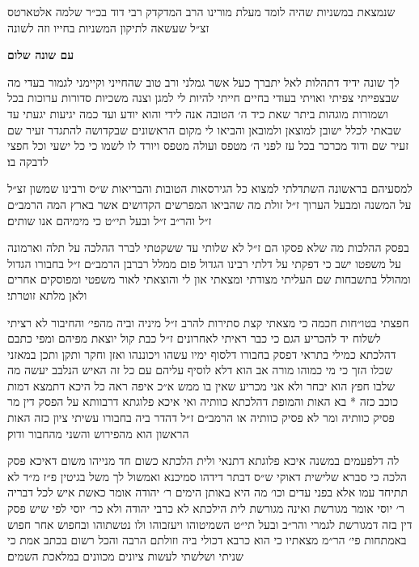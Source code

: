 \setcounter{page}{1}

{
  \centering
  \large
  שנמצאת במשניות שהיה לומד מעלת מורינו הרב המדקדק רבי דוד בכ״ר שלמה אלטארטס זצ״ל שעשאה לתיקון המשניות בחייו וזה לשונה
}

{\centering\LARGE\bfseries עם שונה שלום

}

{
  \small
  \centerlastline
  לך שונה ידיד דתהלות לאל יתברך כעל אשר גמלני ורב טוב שהחייני
  וקיימני לגמור בעדי מה שבצפייתי צפיתי ואויתי בעודי בחיים חייתי להיות
  לי למגן וצנה משכיות סדורות ערוכות בכל ושמורות מוגהות ביתר שאת כיד ה׳
  הטובה אנה לידי\hdot
  והוא יודע ועד כמה יגיעות יגעתי עד שבאתי לכלל ישובן
למוצאן ולמובאן והביאו לי מקום הראשונים שבקדושה להתגדר זעיר שם זעיר שם
ו{\larger דוד}
    מכרכר בכל עז לפני ה׳ מטפס ועולה מטפס ויורד לו לשמו כי כל ישעי וכל
חפצי לדבקה בו׃

למסעיהם בראשונה השתדלתי למצוא כל הגירסאות הטובות
והבריאות ש״ס ורבינו שמשון זצ״ל על המשנה ומבעל הערוך ז״ל זולת מה
שהביאו המפרשים הקדושים אשר בארץ המה הרמב״ם ז״ל והר״ב ז״ל ובעל תי״ט
כי מימיהם אנו שותים׃

בפסק ההלכות מה שלא פסקו הם ז״ל לא שלותי עד ששקטתי לברר
ההלכה על תלה וארמונה על משפטו ישב\hdot
כי דפקתי על דלתי רבינו הגדול
פום ממלל רברבן הרמב״ם ז״ל בחבורו הגדול ומהולל בתשבחות שם העליתי מצודתי
ומצאתי און לי והוצאתי לאור משפטי\hdot
ומפוסקים אחרים\hdot
ולאן מלתא זוטרתי׃

חפצתי בטו״חות חכמה כי מצאתי קצת סתירות להרב ז״ל מיניה וביה
מהפי׳ והחיבור לא רציתי לשלוח יד להכריע\hdot
הגם כי כבר ראיתי לאחרונים
ז״ל כבת קול יוצאת מפיהם ומפי כתבם דהלכתא כמילי בתראי דפסק בחבורו
דלסוף ימיו עשהו ויכוננהו ואזן וחקר ותקן ותכן במאזני שכלו הזך כי מי כמוהו
מורה אב הוא דלא לוסיף עליהם עם כל זה האיש הנלבב יעשה מה שלבו חפץ הוא
יבחר ולא אני מכריע שאין בו ממש\hdot
א״כ איפה ראה כל היכא דתמצא דמות כוכב
כזה * בא האות והמופת דהלכתא כוותיה\hdot
ואי איכא פלוגתא דרבוותא על הפסק
דין מר פסיק כוותיה ומר לא פסיק כוותיה או הרמב״ם ז״ל דהדר ביה בחבורו
עשיתי ציון כזה
{\raisebox{-.5\height}{ ^^^^05af ^^^^0592}}
האות הראשון הוא מהפירוש והשני מהחבור ודוק׃

לה דלפעמים במשנה איכא פלוגתא דתנאי ולית הלכתא כשום חד
מנייהו משום דאיכא פסק הלכה כי סברא שלישית דאוקי ש״ס דבתר דידהו
סמיכנא\hdot
ואמשול לך משל בגיטין פ״ז מ״ד לא תתיחד עמו אלא בפני עדים וכו׳
מה היא באותן הימים ר׳ יהודה אומר כאשת איש לכל דבריה ר׳ יוסי אומר מגורשת
ואינה מגורשת\hdot
לית הילכתא לא כרבי יהודה ולא כר׳ יוסי לפי שיש פסק דין בזה
דמגורשת לגמרי והר״ב ובעל תי״ט השמיטוהו ויעזבוהו ולו נטשתוהו\hdot
ובחפוש אחר
חפוש באמתחות פי׳ הר״מ מצאתיו כי הוא כרבא דכולי ביה\hdot
וזולתם הרבה\hdot
והכל
רשום בכתב אמת כי שניתי ושלשתי לעשות ציונים מכוונים במלאכת השמים׃

}
